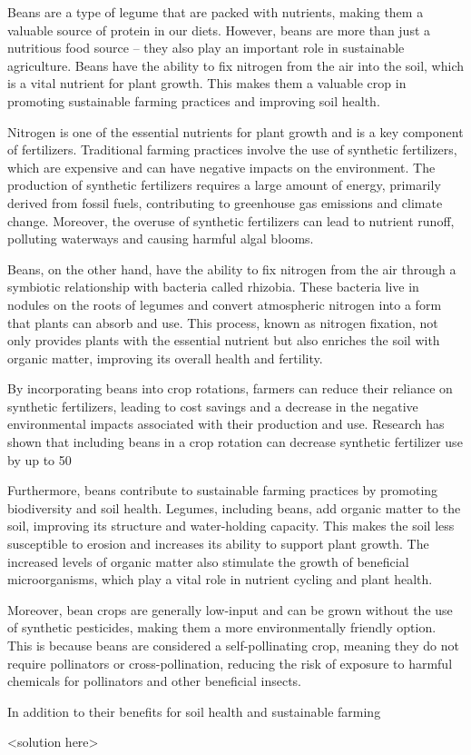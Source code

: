 \question Beans are a type of legume that are packed with nutrients, making them a valuable source of protein in our diets. However, beans are more than just a nutritious food source – they also play an important role in sustainable agriculture. Beans have the ability to fix nitrogen from the air into the soil, which is a vital nutrient for plant growth. This makes them a valuable crop in promoting sustainable farming practices and improving soil health.

Nitrogen is one of the essential nutrients for plant growth and is a key component of fertilizers. Traditional farming practices involve the use of synthetic fertilizers, which are expensive and can have negative impacts on the environment. The production of synthetic fertilizers requires a large amount of energy, primarily derived from fossil fuels, contributing to greenhouse gas emissions and climate change. Moreover, the overuse of synthetic fertilizers can lead to nutrient runoff, polluting waterways and causing harmful algal blooms.

Beans, on the other hand, have the ability to fix nitrogen from the air through a symbiotic relationship with bacteria called rhizobia. These bacteria live in nodules on the roots of legumes and convert atmospheric nitrogen into a form that plants can absorb and use. This process, known as nitrogen fixation, not only provides plants with the essential nutrient but also enriches the soil with organic matter, improving its overall health and fertility.

By incorporating beans into crop rotations, farmers can reduce their reliance on synthetic fertilizers, leading to cost savings and a decrease in the negative environmental impacts associated with their production and use. Research has shown that including beans in a crop rotation can decrease synthetic fertilizer use by up to 50%

Furthermore, beans contribute to sustainable farming practices by promoting biodiversity and soil health. Legumes, including beans, add organic matter to the soil, improving its structure and water-holding capacity. This makes the soil less susceptible to erosion and increases its ability to support plant growth. The increased levels of organic matter also stimulate the growth of beneficial microorganisms, which play a vital role in nutrient cycling and plant health.

Moreover, bean crops are generally low-input and can be grown without the use of synthetic pesticides, making them a more environmentally friendly option. This is because beans are considered a self-pollinating crop, meaning they do not require pollinators or cross-pollination, reducing the risk of exposure to harmful chemicals for pollinators and other beneficial insects.

In addition to their benefits for soil health and sustainable farming
\begin{solution}
<solution here>
\end{solution}
